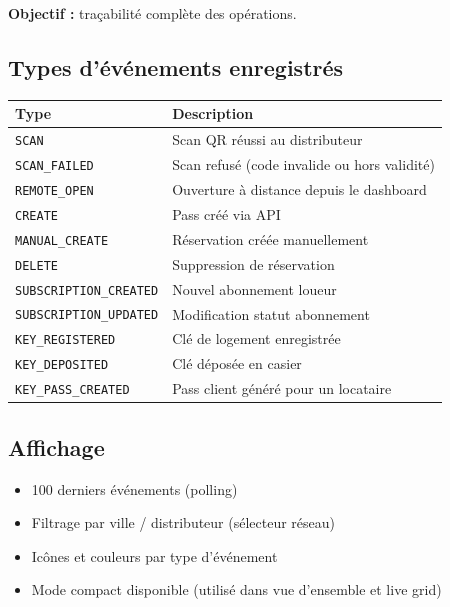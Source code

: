 \documentclass[11pt,a4paper]{article}
\begin{document}
\textbf{Objectif :} traçabilité complète des opérations.

\subsection{Types d'événements enregistrés}

\begin{center}
\small
\begin{tabular}{ll}
  \toprule
  \textbf{Type} & \textbf{Description} \\
  \midrule
  \texttt{SCAN} & Scan QR réussi au distributeur \\
  \texttt{SCAN\_FAILED} & Scan refusé (code invalide ou hors validité) \\
  \texttt{REMOTE\_OPEN} & Ouverture à distance depuis le dashboard \\
  \texttt{CREATE} & Pass créé via API \\
  \texttt{MANUAL\_CREATE} & Réservation créée manuellement \\
  \texttt{DELETE} & Suppression de réservation \\
  \texttt{SUBSCRIPTION\_CREATED} & Nouvel abonnement loueur \\
  \texttt{SUBSCRIPTION\_UPDATED} & Modification statut abonnement \\
  \texttt{KEY\_REGISTERED} & Clé de logement enregistrée \\
  \texttt{KEY\_DEPOSITED} & Clé déposée en casier \\
  \texttt{KEY\_PASS\_CREATED} & Pass client généré pour un locataire \\
  \bottomrule
\end{tabular}
\end{center}

\subsection{Affichage}
\begin{itemize}[noitemsep]
  \item 100 derniers événements (polling)
  \item Filtrage par ville / distributeur (sélecteur réseau)
  \item Icônes et couleurs par type d'événement
  \item Mode compact disponible (utilisé dans vue d'ensemble et live grid)
\end{itemize}

\end{document}

